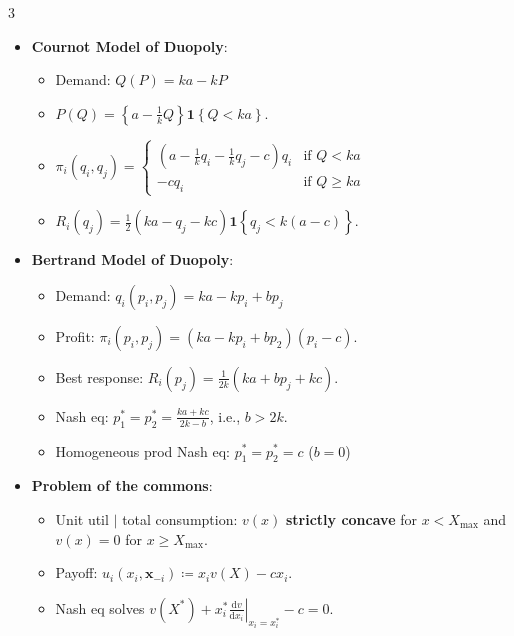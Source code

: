 \documentclass[8pt]{article}
\begin{document}
\begin{multicols*}{3}
\begin{itemize}
            \item \textbf{Cournot Model of Duopoly}:
            \begin{itemize}
                \setlength\itemsep{0pt}
                \item Demand: $Q\left(P\right) = ka - kP$
                \item $P\left(Q\right) = \left\{a - \frac{1}{k}Q\right\}\mathbf{1}\left\{Q < ka\right\}$.
                \item $\pi_i\left(q_i, q_j\right) = \begin{cases}
                    \left(a - \frac{1}{k}q_i - \frac{1}{k}q_j - c\right)q_i & \textrm{if } Q < ka \\
                    -cq_i & \textrm{if } Q \geq ka
                \end{cases}$
                \item $R_i\left(q_j\right) = \frac{1}{2}\left(ka - q_j - kc\right)\mathbf{1}\left\{q_j < k\left(a - c\right)\right\}$.
            \end{itemize}
            \item \textbf{Bertrand Model of Duopoly}:
            \begin{itemize}
                \setlength\itemsep{0pt}
                \item Demand: $q_i\left(p_i, p_j\right) = ka - kp_i + bp_j$
                \item Profit: $\pi_i\left(p_i, p_j\right) = \left(ka - kp_i + bp_2\right)\left(p_i - c\right)$.
                \item Best response: $R_i\left(p_j\right) = \frac{1}{2k}\left(ka + bp_j + kc\right)$.
                \item Nash eq: $p_1^* = p_2^* = \frac{ka + kc}{2k - b}$, i.e., $b > 2k$.
                \item Homogeneous prod Nash eq: $p_1^* = p_2^* = c$ ($b = 0$)
            \end{itemize}
            \item \textbf{Problem of the commons}:
            \begin{itemize}
                \setlength\itemsep{0pt}
                \item Unit util $\mid$ total consumption: $v\left(x\right)$ \textbf{strictly concave} for $x < X_{\max}$ and $v\left(x\right) = 0$ for $x \geq X_{\max}$.
                \item Payoff: $u_i\left(x_i, \bm{x}_{-i}\right) \coloneqq x_iv\left(X\right) - cx_i$.
                \item Nash eq solves $v\left(X^*\right) + x_i^*\left.\frac{\mathrm{d} v}{\mathrm{d} x_i}\right\rvert_{x_i = x_i^*} - c = 0$.

\end{itemize}
\end{itemize}
\end{multicols*}
\end{document}
